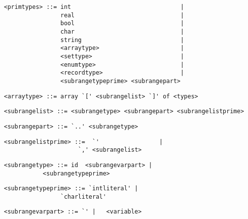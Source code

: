 \begin{footnotesize}
\begin{lstlisting}[frame=single, label={primtypes}, language=pie]
<primtypes> ::= int                               |
                real                              |
                bool                              |
                char                              |
                string                            |
                <arraytype>                       |
                <settype>                         |
                <enumtype>                        |
                <recordtype>                      |
                <subrangetypeprime> <subrangepart>
\end{lstlisting}

\begin{lstlisting}[frame=single, label={arraytype}, language=pie]
<arraytype> ::= array `[' <subrangelist> `]' of <types>
\end{lstlisting}

\begin{lstlisting}[frame=single, label={subrangelist}, language=pie]
<subrangelist> ::= <subrangetype> <subrangepart> <subrangelistprime>
\end{lstlisting}

\begin{lstlisting}[frame=single, label={subrangepart}, language=pie]
<subrangepart> ::= `..' <subrangetype> 
\end{lstlisting}

\begin{lstlisting}[frame=single, label={subrangelistprime}, language=pie]
<subrangelistprime> ::=  `'                 |
	                 `,' <subrangelist>
\end{lstlisting}

\begin{lstlisting}[frame=single, label={subrangetype}, language=pie]
<subrangetype> ::= id  <subrangevarpart> |
		   <subrangetypeprime>
\end{lstlisting}

\begin{lstlisting}[frame=single, label={subrangetypeprime}, language=pie]
<subrangetypeprime> ::= `intliteral' | 
		        `charliteral'
\end{lstlisting}

\begin{lstlisting}[frame=single, label={subrangevarpart}, language=pie]
<subrangevarpart> ::= `' |   <variable>
\end{lstlisting}


\end{footnotesize}
